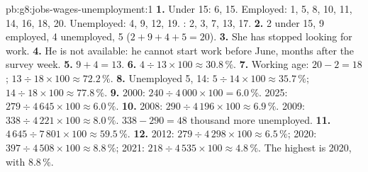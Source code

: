 \begin{solution}{pb:g8:jobs-wages-unemployment:1}
\textbf{1.} Under 15: 6, 15. Employed: 1, 5, 8, 10, 11, 14, 16, 18, 20. Unemployed: 4, 9, 12, 19.
: 2, 3, 7, 13, 17.
\textbf{2.} 2 under 15, 9 employed, 4 unemployed, 5  ($2 + 9 + 4 + 5 = 20$).
\textbf{3.} She has stopped looking for work.
\textbf{4.} He is not available: he cannot start work before June, months after the survey week.
\textbf{5.} $9 + 4 = 13$.
\textbf{6.} $4 \div 13 \times 100 \approx 30.8\,\%$.
\textbf{7.} Working age: $20 - 2 = 18$; $13 \div 18 \times 100 \approx 72.2\,\%$.
\textbf{8.} Unemployed 5,  14:  $5 \div 14 \times 100 \approx 35.7\,\%$;
 $14 \div 18 \times 100 \approx 77.8\,\%$.
\textbf{9.} 2000: $240 \div 4\,000 \times 100 = 6.0\,\%$. 2025: $279 \div 4\,645 \times 100 \approx
6.0\,\%$.
\textbf{10.} 2008: $290 \div 4\,196 \times 100 \approx 6.9\,\%$. 2009: $338 \div 4\,221 \times 100
\approx 8.0\,\%$. $338 - 290 = 48$ thousand more unemployed.
\textbf{11.} $4\,645 \div 7\,801 \times 100 \approx 59.5\,\%$.
\textbf{12.} 2012: $279 \div 4\,298 \times 100 \approx 6.5\,\%$; 2020: $397 \div 4\,508 \times 100
\approx 8.8\,\%$; 2021: $218 \div 4\,535 \times 100 \approx 4.8\,\%$. The highest is 2020, with
$8.8\,\%$.
\end{solution}
